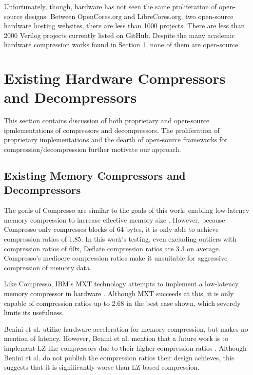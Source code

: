 \documentclass[doublespace,nopageskip]{VTthesis}
\begin{document}
Unfortunately, though, hardware has not seen the same proliferation of open-source designs. Between OpenCores.org and LibreCores.org, two open-source hardware hosting websites, there are less than 1000 projects. There are less than 2000 Verilog projects currently listed on GitHub. Despite the many academic hardware compression works found in Section \ref{se:existing_hardware_compressors_and_decompressors}, none of them are open-source.

\section{Existing Hardware Compressors and Decompressors}\label{se:existing_hardware_compressors_and_decompressors}
This section contains discussion of both proprietary and open-source ipmlementations of compressors and decompressors. The proliferation of proprietary implementations and the dearth of open-source frameworks for compression/decompression further motivate our approach.

\subsection{Existing Memory Compressors and Decompressors}\label{ss:other_memory_compressors_and_decompressors}
The goals of Compresso are similar to the goals of this work: enabling low-latency memory compression to increase effective memory size \cite{compresso}. However, because Compresso only compresses blocks of 64 bytes, it is only able to achieve compression ratios of 1.85. In this work's testing, even excluding outliers with compression ratios of 60x, Deflate compression ratios are 3.3 on average. Compresso's mediocre compression ratios make it unsuitable for aggressive compression of memory data.

Like Compresso, IBM's MXT technology attempts to implement a low-latency memory compressor in hardware \cite{mxt}. Although MXT succeeds at this, it is only capable of compression ratios up to 2.68 in the best case shown, which severely limits its usefulness.

Benini et al. utilize hardware acceleration for memory compression, but makes no mention of latency. However, Benini et al. mention that a future work is to implement LZ-like compressors due to their higher compression ratios \cite{memorycompressionenergy}. Although Benini et al. do not publish the compression ratios their design achieves, this suggests that it is significantly worse than LZ-based compression.
\end{document}
